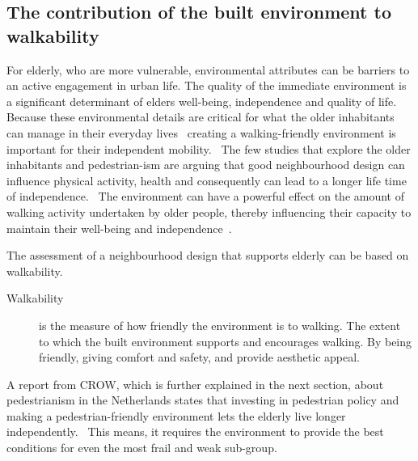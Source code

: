 \subsection{The contribution of the built environment to walkability}
For elderly, who are more vulnerable, environmental attributes can be barriers to an active engagement in urban life. The quality of the immediate environment is a significant determinant of elders well-being, independence and quality of life.~\cite{Vine2012} Because these environmental details are critical for what the older inhabitants can manage in their everyday lives~\cite{Stahl2013, Stahl2008, Clarke2011, Annear2014} creating a walking-friendly environment is important for their independent mobility.~\cite{Sauter2010} The few studies that explore the older inhabitants and pedestrian-ism are arguing that good neighbourhood design can influence physical activity, health and consequently can lead to a longer life time of independence.~\cite{Vine2012, Rantakokko2009, Phillips2013, Beard2009, Rosso2011, Clarke2011}
The environment can have a powerful effect on the amount of walking activity undertaken by older people, thereby influencing their capacity to maintain their well-being and independence~\cite{Vine2012}.

The assessment of a neighbourhood design that supports elderly can be based on walkability. \begin{description}\item[Walkability] is the measure of how friendly the environment is to walking. The extent to which the built environment supports and encourages walking. By being friendly, giving comfort and safety, and provide aesthetic appeal.~\cite{Vine2012, Borst2008}\end{description}

A report from CROW, which is further explained in the next section, about pedestrianism in the Netherlands states that investing in pedestrian policy and making a pedestrian-friendly environment lets the elderly live longer independently.~\cite{Eijnde2011, Crow2014} This means, it requires the environment to provide the best conditions for even the most frail and weak sub-group.

